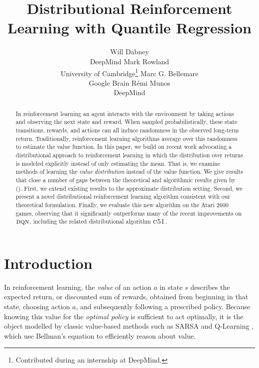 \documentclass[letterpaper]{article}
\def \cfo {\textsc{c51}}
\def \dqn {\textsc{dqn}}
\newcommand{\citet}[1]{\citeauthor{#1} (\citeyear{#1})}
\begin{document}
%

%
\title{Distributional Reinforcement Learning with Quantile Regression}
\author{Will Dabney\\ DeepMind \And Mark Rowland\\ University of Cambridge\thanks{Contributed during an internship at DeepMind.} \And Marc G. Bellemare\\ Google Brain \And R\'emi Munos\\ DeepMind}

\nocopyright

\maketitle
\begin{abstract}
In reinforcement learning an agent interacts with the environment by taking actions and observing the next state and reward. When sampled probabilistically, these state transitions, rewards, and actions can all induce randomness in the observed long-term return. Traditionally, reinforcement learning algorithms average over this randomness to estimate the value function. In this paper, we build on recent work advocating a distributional approach to reinforcement learning in which the distribution over returns is modeled explicitly instead of only estimating the mean. That is, we examine methods of learning the \textit{value distribution} instead of the value function. We give results that close a number of gaps between the theoretical and algorithmic results given by \citet{c51}. First, we extend existing results to the approximate distribution setting. Second, we present a novel distributional reinforcement learning algorithm consistent with our theoretical formulation. Finally, we evaluate this new algorithm on the Atari 2600 games, observing that it significantly outperforms many of the recent improvements on $\dqn$, including the related distributional algorithm $\cfo$.
\end{abstract}

\section{Introduction}

In reinforcement learning, the \emph{value} of an action $a$ in state $s$ describes the expected return, or discounted sum of rewards, obtained from beginning in that state, choosing action $a$, and subsequently following a prescribed policy. Because knowing this value for the \emph{optimal policy} is sufficient to act optimally, it is the object modelled by classic value-based methods such as SARSA \cite{rummery94online} and Q-Learning \cite{watkins1992q}, which use Bellman's equation \cite{bellman57dynamic} to efficiently reason about value.
\end{document}
